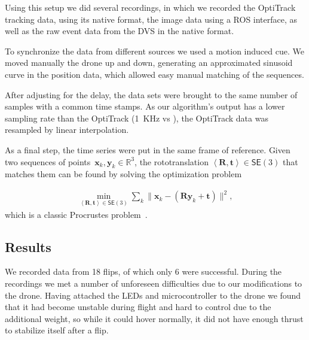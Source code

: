 Using this setup we did several recordings, in which we recorded the
OptiTrack tracking data, using its native format, the image data using
a ROS interface, as well as the raw event data from the DVS in the
native format. 

To synchronize the data from different sources we used a motion induced
cue. We moved manually the drone up and down, generating an approximated
sinusoid curve in the position data, which allowed easy manual matching
of the sequences.

After adjusting for the delay, the data sets were brought to the same
number of samples with a common time stamps. As our algorithm's output
has a lower sampling rate than the OptiTrack (1~KHz vs ),
the OptiTrack data was resampled by linear interpolation.



As a final step, the time series were put in the same frame of reference.
Given two sequences of points~$\boldsymbol{x}_{k},\boldsymbol{y}_{k}\in\mathbb{R}^{3}$,
the rototranslation $\left\langle \boldsymbol{R},\boldsymbol{t}\right\rangle \in\mathsf{SE}(3)$
that matches them can be found by solving the optimization problem

\begin{equation}
\begin{aligned}\min_{\left\langle \boldsymbol{R},\boldsymbol{t}\right\rangle \in\mathsf{SE}(3)}\sum_{k}\|\boldsymbol{x}_{k}-(\boldsymbol{R}\boldsymbol{y}_{k}+\boldsymbol{t})\|^{2},\end{aligned}
\label{eq:leastsquares}
\end{equation}
which is a classic Procrustes problem~\cite{gower04procrustes}.




\subsection{Results \label{sec:evaluation}}

We recorded data from 18 flips, of which only 6 were successful. During
the recordings we met a number of unforeseen difficulties due to our
modifications to the drone. Having attached the LEDs and microcontroller
to the drone we found that it had become unstable during flight and
hard to control due to the additional weight, so while it could hover
normally, it did not have enough thrust to stabilize itself after
a flip.





